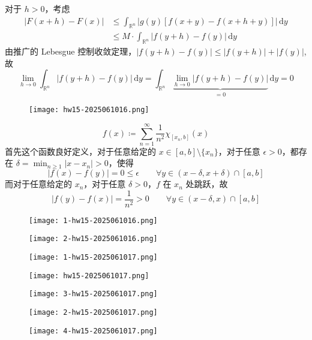 对于 $h>0$，考虑
\[
\begin{aligned}
\lvert F(x+h)-F(x) \rvert  & \leq \int_{\mathbb{R}^{n}}^{} \lvert g(y)[f(x+y)-f(x+h+y)] \rvert  \, \mathrm{d}y \\
  & \leq M\cdot \int_{\mathbb{R}^{n}}^{} \lvert f(y+h)-f(y) \rvert  \, \mathrm{d}y 
\end{aligned}
\]
由推广的 Lebesgue 控制收敛定理，$\lvert f(y+h)-f(y) \rvert\leq \lvert f(y+h) \rvert+\lvert f(y) \rvert$, 故
\[
\lim_{ h \to 0 } \int_{\mathbb{R}^{n}}^{}  \lvert f(y+h)-f(y) \rvert \, \mathrm{d}y =\int_{\mathbb{R}^{n}}^{}\underbrace{  \lim_{ h \to 0 } \lvert f(y+h)-f(y) \rvert }_{ =0 }  \, \mathrm{d}y=0 
\]
\begin{exercise}
\begin{figure}[H]
\centering
\texttt{[image: hw15-2025061016.png]}
\label{}
\end{figure}
\end{exercise}
\[
f(x)\coloneqq \sum_{n=1}^{\infty} \frac{1}{n^{2}}\chi_{[x_n,b]}(x)
\]
首先这个函数良好定义，对于任意给定的 $x\in[a, b]\setminus \{ x_n \}$，对于任意 $\epsilon>0$，都存在 $\delta=\min_{n\geq1}\lvert x-x_n \rvert>0$，使得
\[
\lvert f(x)-f(y) \rvert =0\leq \epsilon \qquad \forall y\in(x-\delta,x+\delta)\cap[a,b]
\]
而对于任意给定的 $x_n$，对于任意 $\delta>0$，$f$ 在 $x_n$ 处跳跃，故
\[
\left\lvert  f\left( y \right)-f(x)  \right\rvert=\frac{1}{n^{2}}>0\qquad \forall y\in(x-\delta,x)\cap[a,b]
\]
\begin{exercise}
\begin{figure}[H]
\centering
\texttt{[image: 1-hw15-2025061016.png]}
\label{}
\end{figure}
\end{exercise}
\begin{figure}[H]
\centering
\texttt{[image: 2-hw15-2025061016.png]}
\label{}
\end{figure}

\begin{figure}[H]
\centering
\texttt{[image: 1-hw15-2025061017.png]}
\label{}
\end{figure}

\begin{exercise}
\begin{figure}[H]
\centering
\texttt{[image: hw15-2025061017.png]}
\label{}
\end{figure}
\end{exercise}
\begin{figure}[H]
\centering
\texttt{[image: 3-hw15-2025061017.png]}
\label{}
\end{figure}

\begin{exercise}
\begin{figure}[H]
\centering
\texttt{[image: 2-hw15-2025061017.png]}
\label{}
\end{figure}
\end{exercise}
\begin{figure}[H]
\centering
\texttt{[image: 4-hw15-2025061017.png]}
\label{}
\end{figure}
